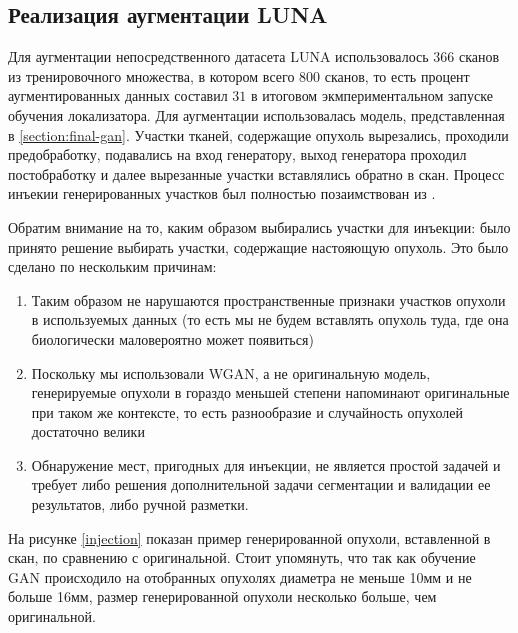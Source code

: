 \subsection{Реализация аугментации LUNA}

Для аугментации непосредственного датасета LUNA использовалось 366 сканов из тренировочного множества, в котором всего 800 сканов, то есть процент аугментированных данных составил $31$ в итоговом экмпериментальном запуске обучения локализатора. Для аугментации использовалась модель, представленная в \ref{section:final-gan}. Участки тканей, содержащие опухоль вырезались, проходили предобработку, подавались на вход генератору, выход генератора проходил постобработку и далее вырезанные участки вставлялись обратно в скан. Процесс инъекии генерированных участков был полностью позаимствован из \cite{mirsky}.

Обратим внимание на то, каким образом выбирались участки для инъекции: было принято решение выбирать участки, содержащие настояющую опухоль. Это было сделано по нескольким причинам:

\begin{enumerate}
    \item Таким образом не нарушаются пространственные признаки участков опухоли в используемых данных (то есть мы не будем вставлять опухоль туда, где она биологически маловероятно может появиться)
    \item Поскольку мы использовали WGAN, а не оригинальную модель, генерируемые опухоли в гораздо меньшей степени напоминают оригинальные при таком же контексте, то есть разнообразие и случайность опухолей достаточно велики
    \item Обнаружение мест, пригодных для инъекции, не является простой задачей и требует либо решения дополнительной задачи сегментации и валидации ее результатов, либо ручной разметки.

\end{enumerate}


На рисунке \ref{injection} показан пример генерированной опухоли, вставленной в скан, по сравнению с оригинальной. Стоит упомянуть, что так как обучение GAN происходило на отобранных опухолях диаметра не меньше 10мм и не больше 16мм, размер генерированной опухоли несколько больше, чем оригинальной.

